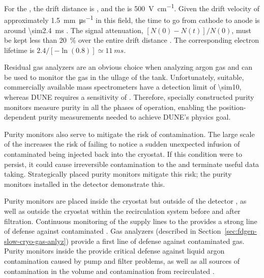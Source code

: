 For the , the drift distance is \spmaxdrift, and the \efield is \SI{500}{\volt\per\centi\meter}. Given the drift velocity of approximately \SI{1.5}{\milli\meter\per\micro\second} in this field, the time to go from cathode to anode is around \SI{\sim2.4}{\milli\second} \cite{Walkowiak:2000wf}.
The   signal attenuation, \([N(0)-N(t)]/N(0)\), must be kept less than \SI{20}{\percent} over the entire drift distance \cite{fdtf-final-report}. The corresponding electron lifetime is $2.4/[-\ln(0.8)] \simeq \SI{11}{ms}$.

Residual gas analyzers are an obvious choice when analyzing argon gas and can be used to monitor the gas in the ullage of the tank. Unfortunately, suitable, commercially available  mass spectrometers have a detection limit of \num{\sim10}, whereas DUNE requires a sensitivity of . Therefore, specially constructed purity monitors measure \lar purity in all the phases of operation, enabling the position-dependent purity measurements needed to achieve DUNE's  physics goal. 

Purity monitors also serve to mitigate the risk of \lar contamination.  The large scale of the  increases the risk of failing to notice a sudden unexpected infusion of contaminated \lar being injected back into the cryostat.   
If this condition were to persist, it could cause irreversible contamination to the  and terminate useful data taking.  Strategically placed purity monitors mitigate this risk; the purity monitors installed in the  detector demonstrate this.

Purity monitors are placed inside the cryostat but outside of the detector , as well as outside the cryostat within the recirculation system before and after filtration. 
Continuous monitoring of  the  supply lines to the  provides a strong line of defense against contaminated \lar. Gas analyzers (described in Section~\ref{sec:fdgen-slow-cryo-gas-anlyz}) provide a first line of defense against contaminated gas.  Purity monitors inside the  provide critical defense against liquid argon contamination caused by pump and filter problems, as well as all sources of contamination in the \lar volume and contamination from recirculated \lar. 

